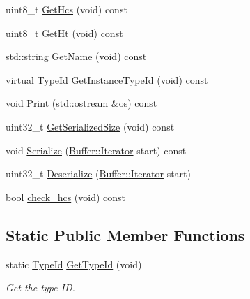 \begin{DoxyCompactItemize}
\item 
uint8\+\_\+t \hyperlink{classns3_1_1GenericMacHeader_aa8ec00b47b689e7a646e5e2541fe60d0}{Get\+Hcs} (void) const 
\item 
uint8\+\_\+t \hyperlink{classns3_1_1GenericMacHeader_a50fd1ee132db1039b06b4ffe3a9455e6}{Get\+Ht} (void) const 
\item 
std\+::string \hyperlink{classns3_1_1GenericMacHeader_aeacac94bc57ed7904c92bce0a729b59b}{Get\+Name} (void) const 
\item 
virtual \hyperlink{classns3_1_1TypeId}{Type\+Id} \hyperlink{classns3_1_1GenericMacHeader_a1ed2adfc6f063fa825ffaaeb472b98c1}{Get\+Instance\+Type\+Id} (void) const 
\item 
void \hyperlink{classns3_1_1GenericMacHeader_aa7c24c85e2382c58d7b7a3550d234b23}{Print} (std\+::ostream \&os) const 
\item 
uint32\+\_\+t \hyperlink{classns3_1_1GenericMacHeader_a406a3aea98a270418d62587315c50deb}{Get\+Serialized\+Size} (void) const 
\item 
void \hyperlink{classns3_1_1GenericMacHeader_a657566205e4e0f3bdc84a410393b024f}{Serialize} (\hyperlink{classns3_1_1Buffer_1_1Iterator}{Buffer\+::\+Iterator} start) const 
\item 
uint32\+\_\+t \hyperlink{classns3_1_1GenericMacHeader_a68a46a2f6f31e73ad9bdc4b3bce59afd}{Deserialize} (\hyperlink{classns3_1_1Buffer_1_1Iterator}{Buffer\+::\+Iterator} start)
\item 
bool \hyperlink{classns3_1_1GenericMacHeader_a1964e44d691fea2bba7bcbc485fd1cbf}{check\+\_\+hcs} (void) const 
\end{DoxyCompactItemize}
\subsection*{Static Public Member Functions}
\begin{DoxyCompactItemize}
\item 
static \hyperlink{classns3_1_1TypeId}{Type\+Id} \hyperlink{classns3_1_1GenericMacHeader_ab076cacf26124420508ca032ec96386e}{Get\+Type\+Id} (void)
\begin{DoxyCompactList}\small\item\em Get the type ID. \end{DoxyCompactList}\end{DoxyCompactItemize}
